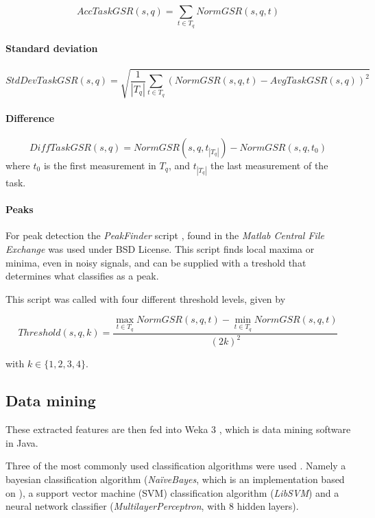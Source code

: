 \documentclass[12pt,leqno,letterpaper]{report} %
\begin{document}
\[
AccTaskGSR(s,q) =  \sum_{t \in T_q} NormGSR(s,q,t)
\]

\paragraph{Standard deviation}

\[
StdDevTaskGSR(s,q) = \sqrt {\frac{1}{\left\vert{T_q}\right\vert}   \sum_{t \in T_q} (NormGSR(s,q,t) - AvgTaskGSR(s,q))^2 }
\]

\paragraph{Difference}

\[
DiffTaskGSR(s,q) = NormGSR(s,q, t_{\left\vert{T_q}\right\vert}) - NormGSR(s,q, t_0)
\]
where $t_0$ is the first measurement in $T_q$, and $t_{\left\vert{T_q}\right\vert}$ the last measurement of the task.

\paragraph{Peaks}
For peak detection the \emph{PeakFinder} script \citep{yoder}, found in the \emph{Matlab Central File Exchange} was used under BSD License. This script finds local maxima or minima, even in noisy signals, and can be supplied with a treshold that determines what classifies as a peak.

This script was called with four different threshold levels, given by

\[
Threshold(s,q,k) = \frac 
{\max_{t \in T_q} NormGSR(s,q,t) - \min_{t \in T_q} NormGSR(s,q,t)} 
{(2k)^2}
\]

with $k \in \{1,2,3,4\}$.


\subsection{Data mining}

These extracted features are then fed into Weka 3 \citep{weka}, which is data mining software in Java. 


Three of the most commonly used classification algorithms were used \citep{small}. Namely a bayesian classification algorithm (\emph{Na\"iveBayes}, which is an implementation based on \citep{john1995estimating}), a support vector machine (SVM) classification algorithm (\emph{LibSVM}) \citep{libsvm} and a neural network classifier (\emph{MultilayerPerceptron}, with 8 hidden layers). 
\end{document}
